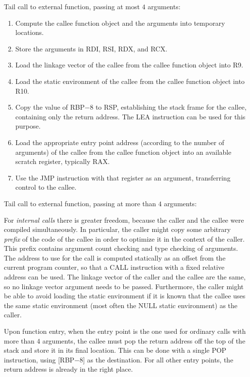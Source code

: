 Tail call to external function, passing at most $4$ arguments:

\begin{enumerate}
\item Compute the callee function object and the arguments into
  temporary locations.
\item Store the arguments in RDI, RSI, RDX, and RCX.
\item Load the linkage vector of the callee from the callee
  function object into R9.
\item Load the static environment of the callee from the callee
  function object into R10.
\item Copy the value of RBP$ - 8$ to RSP, establishing the stack frame
  for the callee, containing only the return address.  The LEA
  instruction can be used for this purpose.
\item Load the appropriate entry point address (according to the
  number of arguments) of the callee from the callee function object
  into an available scratch register, typically RAX.
\item Use the JMP instruction with that register as an argument,
  transferring control to the callee.
\end{enumerate}

Tail call to external function, passing at more than $4$ arguments:%

For \emph{internal calls} there is greater freedom, because the caller
and the callee were compiled simultaneously.  In particular, the
caller might copy some arbitrary \emph{prefix} of the code of the
callee in order to optimize it in the context of the caller.  This
prefix contains argument count checking and type checking of
arguments.  The address to use for the call is computed statically as
an offset from the current program counter, so that a CALL instruction
with a fixed relative address can be used.  The linkage vector of the
caller and the callee are the same, so no linkage vector argument
needs to be passed.  Furthermore, the caller might be able to avoid
loading the static environment if it is known that the callee uses the
same static environment (most often the NULL static environment) as
the caller. 

Upon function entry, when the entry point is the one used for ordinary
calls with more than $4$ arguments, the callee must pop the return
address off the top of the stack and store it in its final location.
This can be done with a single POP instruction, using [RBP$ - 8$] as
the destination.   For all other entry points, the return address is
already in the right place. 

